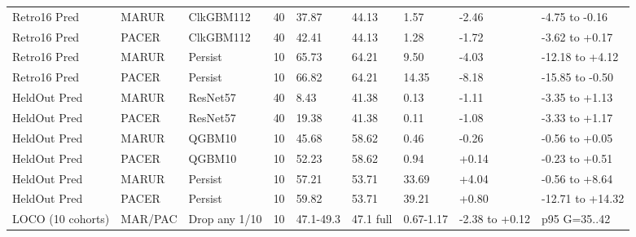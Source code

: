 \begin{table}[!ht]
\begin{tabular}{lllllllll}
Retro16 Pred & MARUR & ClkGBM112 & 40 & 37.87 & 44.13 & 1.57 & -2.46 & -4.75 to -0.16 \\
Retro16 Pred & PACER & ClkGBM112 & 40 & 42.41 & 44.13 & 1.28 & -1.72 & -3.62 to +0.17 \\
Retro16 Pred & MARUR & Persist & 10 & 65.73 & 64.21 & 9.50 & -4.03 & -12.18 to +4.12 \\
Retro16 Pred & PACER & Persist & 10 & 66.82 & 64.21 & 14.35 & -8.18 & -15.85 to -0.50 \\
HeldOut Pred & MARUR & ResNet57 & 40 & 8.43 & 41.38 & 0.13 & -1.11 & -3.35 to +1.13 \\
HeldOut Pred & PACER & ResNet57 & 40 & 19.38 & 41.38 & 0.11 & -1.08 & -3.33 to +1.17 \\
HeldOut Pred & MARUR & QGBM10 & 10 & 45.68 & 58.62 & 0.46 & -0.26 & -0.56 to +0.05 \\
HeldOut Pred & PACER & QGBM10 & 10 & 52.23 & 58.62 & 0.94 & +0.14 & -0.23 to +0.51 \\
HeldOut Pred & MARUR & Persist & 10 & 57.21 & 53.71 & 33.69 & +4.04 & -0.56 to +8.64 \\
HeldOut Pred & PACER & Persist & 10 & 59.82 & 53.71 & 39.21 & +0.80 & -12.71 to +14.32 \\
LOCO (10 cohorts) & MAR/PAC & Drop any 1/10 & 10 & 47.1-49.3 & 47.1 full & 0.67-1.17 & -2.38 to +0.12 & p95 G=35..42 \\
\hline
\end{tabular}
\end{table}
